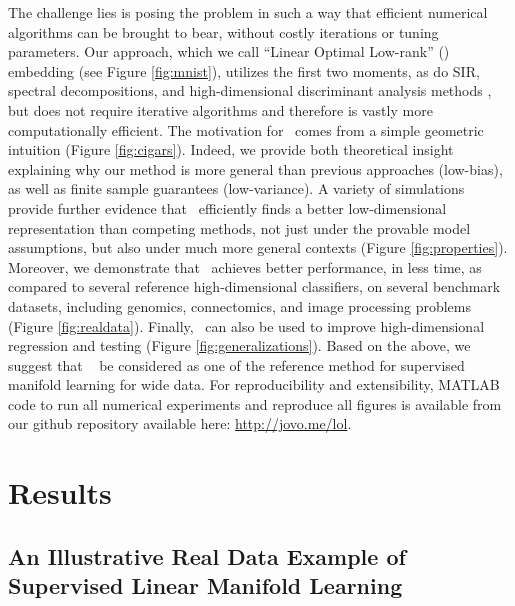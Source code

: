 \documentclass[10pt]{article}
\begin{document}
The challenge lies is posing the problem in such a way that efficient numerical algorithms can be brought to bear, without costly iterations or tuning parameters.  Our approach, which we call ``Linear Optimal Low-rank'' (\Lol) embedding (see Figure \ref{fig:mnist}), utilizes the first two moments, as do SIR, spectral decompositions, and high-dimensional discriminant analysis methods \cite{Bouveyron07a}, but does not require iterative algorithms and therefore is vastly more computationally efficient.  The motivation for \Lol~comes from a simple geometric intuition (Figure \ref{fig:cigars}).  Indeed, we provide both theoretical insight explaining why our method is more general than previous approaches (low-bias), as well as finite sample guarantees (low-variance).  A variety of simulations provide further evidence that \Lol~efficiently finds a better low-dimensional representation than competing methods, not just under the provable model assumptions, but also under much more general contexts (Figure \ref{fig:properties}).  Moreover, we demonstrate that \Lol~achieves better performance, in less time, as compared to several reference high-dimensional classifiers, on several benchmark datasets, including genomics, connectomics, and image processing problems (Figure \ref{fig:realdata}). 
Finally, \Lol~can also be used to improve high-dimensional regression and testing (Figure \ref{fig:generalizations}).  
Based on the above, we suggest that \Lol~ be considered as one of the reference method for supervised manifold learning for wide data. 
For reproducibility and extensibility, MATLAB code to run all numerical experiments and reproduce all figures is available from our github repository available here: \url{http://jovo.me/lol}. 


\section*{Results}

\subsection*{An Illustrative Real Data Example of Supervised Linear Manifold Learning}
\end{document}
